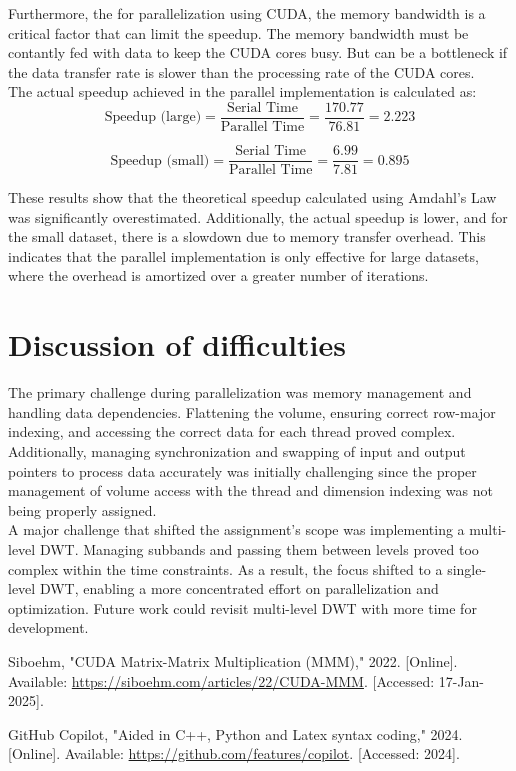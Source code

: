 \documentclass[journal,11pt]{IEEEtran}
\begin{document}
Furthermore, the for parallelization using CUDA, the memory bandwidth is a critical factor that can limit the speedup. The memory bandwidth must be contantly fed with data to keep the CUDA cores busy. But can be a bottleneck if the data transfer rate is slower than the processing rate of the CUDA cores.\\

The actual speedup achieved in the parallel implementation is calculated as:
\begin{equation}
    \text{Speedup (large)} = \frac{\text{Serial Time}}{\text{Parallel Time}} = \frac{170.77}{76.81} = 2.223
\end{equation}  

\begin{equation}
    \text{Speedup (small)} = \frac{\text{Serial Time}}{\text{Parallel Time}} = \frac{6.99}{7.81} = 0.895
\end{equation}

These results show that the theoretical speedup calculated using Amdahl's Law was significantly overestimated. Additionally, the actual speedup is lower, and for the small dataset, there is a slowdown due to memory transfer overhead. This indicates that the parallel implementation is only effective for large datasets, where the overhead is amortized over a greater number of iterations.

\section{Discussion of difficulties}
The primary challenge during parallelization was memory management and handling data dependencies. Flattening the volume, ensuring correct row-major indexing, and accessing the correct data for each thread proved complex. Additionally, managing synchronization and swapping of input and output pointers to process data accurately was initially challenging since the proper management of volume access with the thread and dimension indexing was not being properly assigned.\\

A major challenge that shifted the assignment's scope was implementing a multi-level DWT. Managing subbands and passing them between levels proved too complex within the time constraints. As a result, the focus shifted to a single-level DWT, enabling a more concentrated effort on parallelization and optimization. Future work could revisit multi-level DWT with more time for development.

\begin{thebibliography}{1}

    Siboehm, "CUDA Matrix-Matrix Multiplication (MMM)," 2022. [Online]. Available: \url{https://siboehm.com/articles/22/CUDA-MMM}. [Accessed: 17-Jan-2025].

    GitHub Copilot, "Aided in C++, Python and Latex syntax coding," 2024. [Online]. Available: \url{https://github.com/features/copilot}. [Accessed: 2024].

\end{thebibliography}
\end{document}
